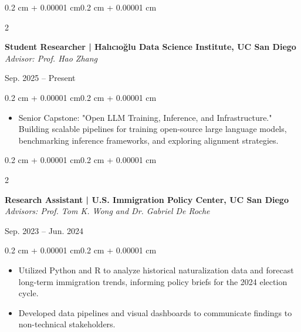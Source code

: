 \documentclass[10pt, letterpaper]{article}
\newenvironment{highlights}{
    \begin{itemize}[
        topsep=0.10 cm,
        parsep=0.10 cm,
        partopsep=0pt,
        itemsep=0pt,
        leftmargin=0.4 cm + 10pt
    ]
}{\end{itemize}}
\newenvironment{onecolentry}{
    \begin{adjustwidth}{0.2 cm + 0.00001 cm}{0.2 cm + 0.00001 cm}
}{\end{adjustwidth}}
\newenvironment{twocolentry}[2][]{
    \onecolentry
    \def\secondColumn{#2}
    \setcolumnwidth{\fill, 4.5 cm}
    \begin{paracol}{2}
}{
    \switchcolumn \raggedleft \secondColumn
    \end{paracol}
    \endonecolentry
}
\begin{document}
\begin{twocolentry}{Sep. 2025 -- Present}
    \textbf{Student Researcher | Halıcıo\u{g}lu Data Science Institute, UC San Diego}\\
    \textit{Advisor: Prof. Hao Zhang}
\end{twocolentry}
\vspace{0.10 cm}
\begin{onecolentry}
    \begin{highlights}
        \item Senior Capstone: "Open LLM Training, Inference, and Infrastructure." Building scalable pipelines for training open-source large language models, benchmarking inference frameworks, and exploring alignment strategies.
    \end{highlights}
\end{onecolentry}
\vspace{0.20 cm}

\begin{twocolentry}{Sep. 2023 -- Jun. 2024}
    \textbf{Research Assistant | U.S. Immigration Policy Center, UC San Diego}\\
    \textit{Advisors: Prof. Tom K. Wong and Dr. Gabriel De Roche}
\end{twocolentry}
\vspace{0.10 cm}
\begin{onecolentry}
    \begin{highlights}
        \item Utilized Python and R to analyze historical naturalization data and forecast long-term immigration trends, informing policy briefs for the 2024 election cycle.
        \item Developed data pipelines and visual dashboards to communicate findings to non-technical stakeholders.
    \end{highlights}
\end{onecolentry}


\end{document}
